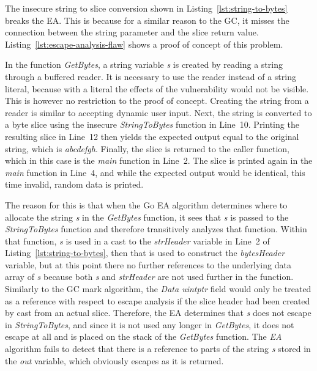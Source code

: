 The insecure string to slice conversion shown in Listing~\ref{lst:string-to-bytes} breaks the \acrshort{EA}.
This is because for a similar reason to the \acrshort{GC}, it misses the connection between the string parameter and
the slice return value.
Listing~\ref{lst:escape-analysis-flaw} shows a proof of concept of this problem.



In the function \textit{GetBytes}, a string variable \textit{s} is created by reading a string through a buffered
reader.
It is necessary to use the reader instead of a string literal, because with a literal the effects of the vulnerability
would not be visible.
This is however no restriction to the proof of concept.
Creating the string from a reader is similar to accepting dynamic user input.
Next, the string is converted to a byte slice using the insecure \textit{StringToBytes} function in Line~10.
Printing the resulting slice in Line~12 then yields the expected output equal to the original string, which is
\textit{abcdefgh}.
Finally, the slice is returned to the caller function, which in this case is the \textit{main} function in Line~2.
The slice is printed again in the \textit{main} function in Line~4, and while the expected output would be identical,
this time invalid, random data is printed.

The reason for this is that when the Go \acrshort{EA} algorithm determines where to allocate the string \textit{s} in
the \textit{GetBytes} function, it sees that \textit{s} is passed to the \textit{StringToBytes} function and therefore
transitively analyzes that function.
Within that function, \textit{s} is used in a cast to the \textit{strHeader} variable in Line~2 of
Listing~\ref{lst:string-to-bytes}, then that is used to construct the \textit{bytesHeader} variable, but at this point
there no further references to the underlying data array of \textit{s} because both \textit{s} and
\textit{strHeader} are not used further in the function.
Similarly to the \acrshort{GC} mark algorithm, the \textit{Data uintptr} field would only be treated as a reference with
respect to escape analysis if the slice header had been created by cast from an actual slice.
Therefore, the \acrshort{EA} determines that \textit{s} does not escape in \textit{StringToBytes}, and since it is not
used any longer in \textit{GetBytes}, it does not escape at all and is placed on the stack of the \textit{GetBytes}
function.
The \textit{EA} algorithm fails to detect that there is a reference to parts of the string \textit{s} stored in the
\textit{out} variable, which obviously escapes as it is returned.

